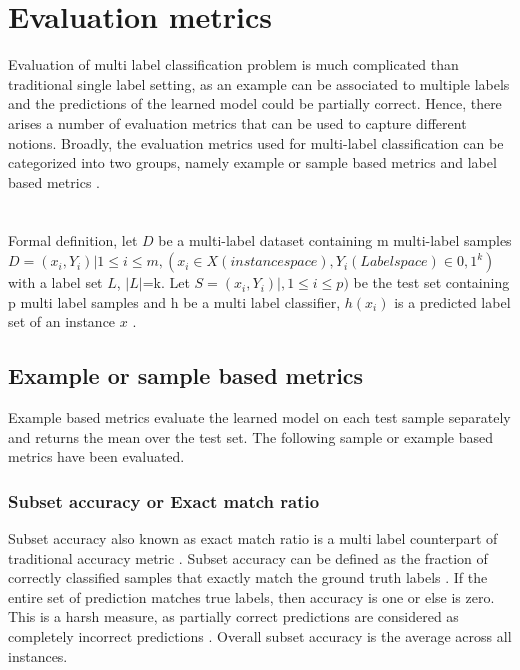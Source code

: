 \section{Evaluation metrics}
Evaluation of multi label classification problem is much complicated than traditional single label setting, as an example can be associated to multiple labels and the predictions of the learned model could be partially correct\cite{sorower2010literature}\cite{zhang2013review}. Hence, there arises a number of evaluation metrics that can be used to capture different notions. 
Broadly, the evaluation metrics used for multi-label classification can be categorized into two groups, namely example or sample based metrics and label based metrics \cite{zhang2013review}.
\\

\\
\\
Formal definition, let $D$ be a multi-label dataset containing m multi-label samples $D = {(x_i,Y_i)|1\leq i \leq m}, (x_i \in X (instance space), Y_i (Label space) \in {0,1}^k)$ with a label set $L$, $|L|$=k. Let $S = {(x_i,Y_i) | ,1\leq i \leq p)}$ be the test set containing p multi label samples and h be a multi label classifier, $h(x_i)$ is a predicted label set of an instance $x$ \cite{zhang2013review}.

\subsection{Example or sample based metrics}
Example based metrics evaluate the learned model on each test sample separately and returns the mean over the test set\cite{zhang2013review}. The following sample or example based metrics have been evaluated.
 
\subsubsection{Subset accuracy or Exact match ratio}
 Subset accuracy also known as exact match ratio is a multi label counterpart of traditional accuracy metric \cite{zhang2013review}. Subset accuracy can be defined as the fraction of correctly classified samples that exactly match the ground truth labels \cite{zhang2013review}. If the entire set of prediction matches true labels, then accuracy is one or else is zero. This is a harsh measure, as partially correct predictions are considered as completely incorrect predictions\cite{sorower2010literature} \cite{zhang2010multi}.  Overall subset accuracy is the average across all instances. 


